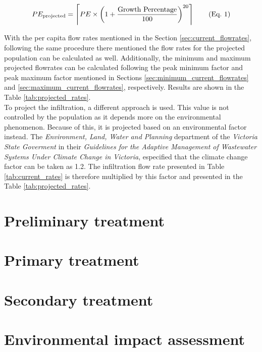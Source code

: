 \documentclass[12pt]{article}
\begin{document}
\begin{align}
  \refstepcounter{equation}
  PE_{\text{projected}} = \left\lceil PE \times \left(1 + \frac{\text{Growth Percentage}}{100} \right)^{20} \right\rceil 
  \tag{Eq.~\theequation} \label{eq:population_projection}
\end{align}

With the per capita flow rates mentioned in the Section \ref{sec:current_flowrates}, following the same procedure there mentioned
the flow rates for the projected population can be calculated as well. Additionally, the minimum and maximum projected flowrates
can be calculated following the peak minimum factor and peak maximum factor mentioned in Sections \ref{sec:minimum_current_flowrates}
and \ref{sec:maximum_current_flowrates}, respectively. Results are shown in the Table \ref{tab:projected_rates}.\\

To project the infiltration, a different approach is used. This value is not controlled by
the population as it depends more on the environmental phenomenon. Because of this, it is projected
based on an environmental factor instead. The \textit{Environment, Land, Water and Planning} department
of the \textit{Victoria State Goverment} in their \textit{Guidelines for the Adaptive Management of 
Wastewater Systems Under Climate Change in Victoria}, especified that the climate change factor
can be taken as 1.2. The infiltration flow rate presented in Table \ref{tab:current_rates} is therefore multiplied by this
factor and presented in the Table \ref{tab:projected_rates}.





\newpage

\section{Preliminary treatment}
\newpage

\section{Primary treatment}
\newpage

\section{Secondary treatment}
\newpage

\section{Environmental impact assessment}
\newpage
\end{document}
